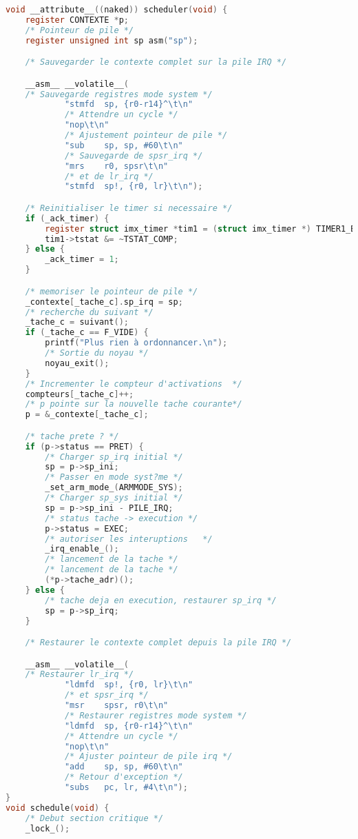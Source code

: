 \begin{lstlisting}[language=C, caption=noyau.c]
void __attribute__((naked)) scheduler(void) {
    register CONTEXTE *p;
    /* Pointeur de pile */
    register unsigned int sp asm("sp");

    /* Sauvegarder le contexte complet sur la pile IRQ */

    __asm__ __volatile__(
    /* Sauvegarde registres mode system */
            "stmfd  sp, {r0-r14}^\t\n"
            /* Attendre un cycle */
            "nop\t\n"
            /* Ajustement pointeur de pile */
            "sub    sp, sp, #60\t\n"
            /* Sauvegarde de spsr_irq */
            "mrs    r0, spsr\t\n"
            /* et de lr_irq */
            "stmfd  sp!, {r0, lr}\t\n");

    /* Reinitialiser le timer si necessaire */
    if (_ack_timer) {
        register struct imx_timer *tim1 = (struct imx_timer *) TIMER1_BASE;
        tim1->tstat &= ~TSTAT_COMP;
    } else {
        _ack_timer = 1;
    }

    /* memoriser le pointeur de pile */
    _contexte[_tache_c].sp_irq = sp;
    /* recherche du suivant */
    _tache_c = suivant();
    if (_tache_c == F_VIDE) {
        printf("Plus rien à ordonnancer.\n");
        /* Sortie du noyau */
        noyau_exit();
    }
    /* Incrementer le compteur d'activations  */
    compteurs[_tache_c]++;
    /* p pointe sur la nouvelle tache courante*/
    p = &_contexte[_tache_c];

    /* tache prete ? */
    if (p->status == PRET) {
        /* Charger sp_irq initial */
        sp = p->sp_ini;
        /* Passer en mode syst?me */
        _set_arm_mode_(ARMMODE_SYS);
        /* Charger sp_sys initial */
        sp = p->sp_ini - PILE_IRQ;
        /* status tache -> execution */
        p->status = EXEC;
        /* autoriser les interuptions   */
        _irq_enable_();
        /* lancement de la tache */
        /* lancement de la tache */
        (*p->tache_adr)();
    } else {
        /* tache deja en execution, restaurer sp_irq */
        sp = p->sp_irq;
    }

    /* Restaurer le contexte complet depuis la pile IRQ */

    __asm__ __volatile__(
    /* Restaurer lr_irq */
            "ldmfd  sp!, {r0, lr}\t\n"
            /* et spsr_irq */
            "msr    spsr, r0\t\n"
            /* Restaurer registres mode system */
            "ldmfd  sp, {r0-r14}^\t\n"
            /* Attendre un cycle */
            "nop\t\n"
            /* Ajuster pointeur de pile irq */
            "add    sp, sp, #60\t\n"
            /* Retour d'exception */
            "subs   pc, lr, #4\t\n");
}
void schedule(void) {
    /* Debut section critique */
    _lock_();


\end{lstlisting}
